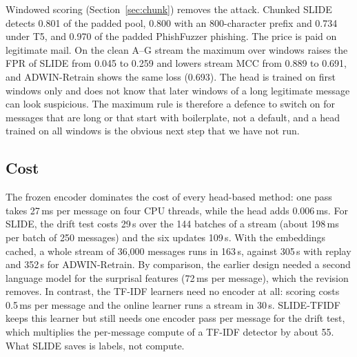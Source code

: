 

Windowed scoring (Section~\ref{sec:chunk}) removes the attack. Chunked SLIDE detects 0.801 of the padded pool, 0.800 with an 800-character prefix and 0.734 under T5, and 0.970 of the padded PhishFuzzer phishing. The price is paid on legitimate mail. On the clean A--G stream the maximum over windows raises the FPR of SLIDE from 0.045 to 0.259 and lowers stream MCC from 0.889 to 0.691, and ADWIN-Retrain shows the same loss (0.693). The head is trained on first windows only and does not know that later windows of a long legitimate message can look suspicious. The maximum rule is therefore a defence to switch on for messages that are long or that start with boilerplate, not a default, and a head trained on all windows is the obvious next step that we have not run.



\subsection{Cost}\label{sec:cost}
The frozen encoder dominates the cost of every head-based method: one pass takes 27\,ms per message on four CPU threads, while the head adds 0.006\,ms. For SLIDE, the drift test costs 29\,s over the 144 batches of a stream (about 198\,ms per batch of 250 messages) and the six updates 109\,s. With the embeddings cached, a whole stream of 36{,}000 messages runs in 163\,s, against 305\,s with replay and 352\,s for ADWIN-Retrain. By comparison, the earlier design needed a second language model for the surprisal features (72\,ms per message), which the revision removes. In contrast, the TF-IDF learners need no encoder at all: scoring costs 0.5\,ms per message and the online learner runs a stream in 30\,s. SLIDE-TFIDF keeps this learner but still needs one encoder pass per message for the drift test, which multiplies the per-message compute of a TF-IDF detector by about 55. What SLIDE saves is labels, not compute.

